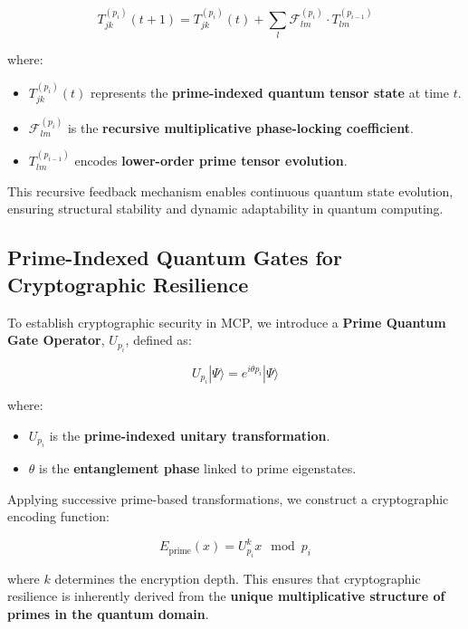 \documentclass{article}
\theoremstyle{plain}
\theoremstyle{plain}
\theoremstyle{definition}
\theoremstyle{remark}
\begin{document}
\begin{equation}
T_{jk}^{(p_i)}(t+1) = T_{jk}^{(p_i)}(t) + \sum_{l} \mathcal{F}_{lm}^{(p_i)} \cdot T_{lm}^{(p_{i-1})}
\end{equation}

where:
\begin{itemize}
    \item $T_{jk}^{(p_i)}(t)$ represents the \textbf{prime-indexed quantum tensor state} at time $t$.
    \item $\mathcal{F}_{lm}^{(p_i)}$ is the \textbf{recursive multiplicative phase-locking coefficient}.
    \item $T_{lm}^{(p_{i-1})}$ encodes \textbf{lower-order prime tensor evolution}.
\end{itemize}

This recursive feedback mechanism enables continuous quantum state evolution, ensuring structural stability and dynamic adaptability in quantum computing.

\subsection{Prime-Indexed Quantum Gates for Cryptographic Resilience}

To establish cryptographic security in MCP, we introduce a \textbf{Prime Quantum Gate Operator}, $U_{p_i}$, defined as:

\begin{equation}
U_{p_i} |\Psi\rangle = e^{i \theta p_i} |\Psi\rangle
\end{equation}

where:
\begin{itemize}
    \item $U_{p_i}$ is the \textbf{prime-indexed unitary transformation}.
    \item $\theta$ is the \textbf{entanglement phase} linked to prime eigenstates.
\end{itemize}

Applying successive prime-based transformations, we construct a cryptographic encoding function:

\begin{equation}
E_{\text{prime}}(x) = U_{p_i}^k x \mod p_i
\end{equation}

where $k$ determines the encryption depth. This ensures that cryptographic resilience is inherently derived from the \textbf{unique multiplicative structure of primes in the quantum domain}.
\end{document}
